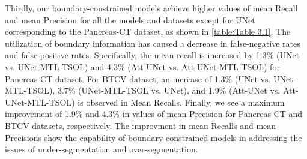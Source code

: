 \documentclass[final,5p,times,twocolumn]{elsarticle}
\begin{document}
Thirdly, our boundary-constrained models achieve higher values of mean Recall and mean Precision for all the models and datasets except for UNet corresponding to the Pancreas-CT dataset, as shown in  \autoref{table:Table 3.1}. The utilization of boundary information has caused a decrease in false-negative rates and false-positive rates. Specifically, the mean recall is increased by 1.3\% (UNet vs. UNet-MTL-TSOL) and 4.3\% (Att-UNet vs. Att-UNet-MTL-TSOL) for Pancreas-CT dataset. For BTCV dataset, an increase of 1.3\% (UNet vs. UNet-MTL-TSOL), 3.7\% (UNet-MTL-TSOL vs. UNet), and 1.9\% (Att-UNet vs. Att-UNet-MTL-TSOL) is observed in Mean Recalls. Finally, we see a maximum improvement of 1.9\% and 4.3\% in values of mean Precision for Pancreas-CT and BTCV datasets, respectively. The improvment in mean Recalls and mean Precisions show the capability of boundary-constrained models in addressing the issues of under-segmentation and over-segmentation. 
\end{document}
